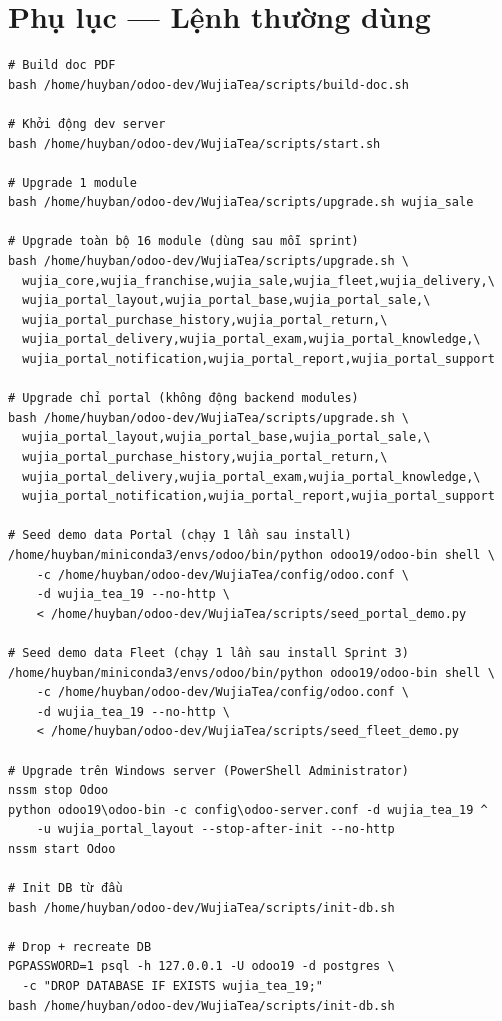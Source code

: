 \chapter{Phụ lục — Lệnh thường dùng}

\begin{lstlisting}[style=shell]
# Build doc PDF
bash /home/huyban/odoo-dev/WujiaTea/scripts/build-doc.sh

# Khởi động dev server
bash /home/huyban/odoo-dev/WujiaTea/scripts/start.sh

# Upgrade 1 module
bash /home/huyban/odoo-dev/WujiaTea/scripts/upgrade.sh wujia_sale

# Upgrade toàn bộ 16 module (dùng sau mỗi sprint)
bash /home/huyban/odoo-dev/WujiaTea/scripts/upgrade.sh \
  wujia_core,wujia_franchise,wujia_sale,wujia_fleet,wujia_delivery,\
  wujia_portal_layout,wujia_portal_base,wujia_portal_sale,\
  wujia_portal_purchase_history,wujia_portal_return,\
  wujia_portal_delivery,wujia_portal_exam,wujia_portal_knowledge,\
  wujia_portal_notification,wujia_portal_report,wujia_portal_support

# Upgrade chỉ portal (không động backend modules)
bash /home/huyban/odoo-dev/WujiaTea/scripts/upgrade.sh \
  wujia_portal_layout,wujia_portal_base,wujia_portal_sale,\
  wujia_portal_purchase_history,wujia_portal_return,\
  wujia_portal_delivery,wujia_portal_exam,wujia_portal_knowledge,\
  wujia_portal_notification,wujia_portal_report,wujia_portal_support

# Seed demo data Portal (chạy 1 lần sau install)
/home/huyban/miniconda3/envs/odoo/bin/python odoo19/odoo-bin shell \
    -c /home/huyban/odoo-dev/WujiaTea/config/odoo.conf \
    -d wujia_tea_19 --no-http \
    < /home/huyban/odoo-dev/WujiaTea/scripts/seed_portal_demo.py

# Seed demo data Fleet (chạy 1 lần sau install Sprint 3)
/home/huyban/miniconda3/envs/odoo/bin/python odoo19/odoo-bin shell \
    -c /home/huyban/odoo-dev/WujiaTea/config/odoo.conf \
    -d wujia_tea_19 --no-http \
    < /home/huyban/odoo-dev/WujiaTea/scripts/seed_fleet_demo.py

# Upgrade trên Windows server (PowerShell Administrator)
nssm stop Odoo
python odoo19\odoo-bin -c config\odoo-server.conf -d wujia_tea_19 ^
    -u wujia_portal_layout --stop-after-init --no-http
nssm start Odoo

# Init DB từ đầu
bash /home/huyban/odoo-dev/WujiaTea/scripts/init-db.sh

# Drop + recreate DB
PGPASSWORD=1 psql -h 127.0.0.1 -U odoo19 -d postgres \
  -c "DROP DATABASE IF EXISTS wujia_tea_19;"
bash /home/huyban/odoo-dev/WujiaTea/scripts/init-db.sh
\end{lstlisting}
